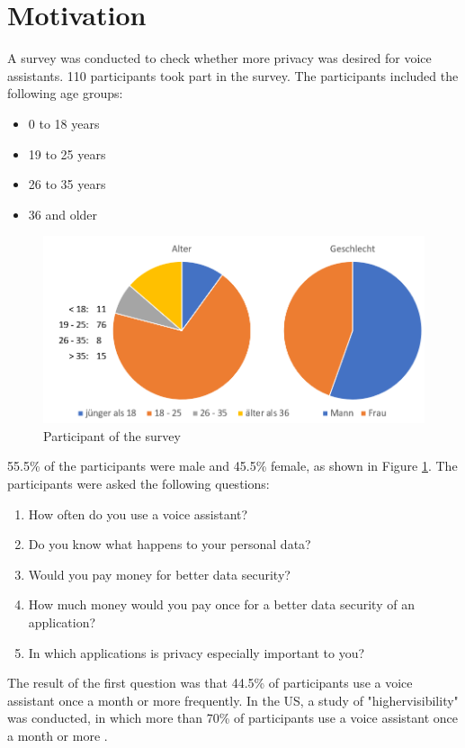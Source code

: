 \section{Motivation}\label{sec:motivaiton}
A survey was conducted to check whether more privacy was desired for voice assistants. 110 participants took part in the survey. The participants included the following age groups:
\begin{itemize}
	\item 0 to 18 years 
	\item 19 to 25 years
	\item 26 to 35 years
	\item 36 and older	
\end{itemize}

\begin{figure}[h]
	\centering
	\includegraphics[width=0.9\linewidth]{Picture/umfrage_teilnehmer}
	\caption[Participant of the survey]{Participant of the survey}
	\label{fig:umfrage_teilnehmer}
\end{figure}

55.5\% of the participants were male and 45.5\% female, as shown in Figure \ref{fig:umfrage_teilnehmer}. The participants were asked the following questions:

\begin{enumerate}	
	\item How often do you use a voice assistant?
	\item Do you know what happens to your personal data?
	\item Would you pay money for better data security?
	\item How much money would you pay once for a better data security of an application?
	\item In which applications is privacy especially important to you?
\end{enumerate}

The result of the first question was that 44.5\% of participants use a voice assistant once a month or more frequently. In the US, a study of "highervisibility" was conducted, in which more than 70\% of participants use a voice assistant once a month or more \cite{highervisibility}.

